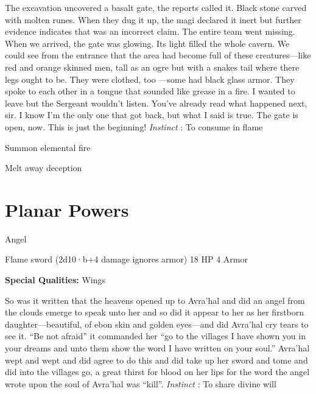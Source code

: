 \startMonsterDescription
The excavation uncovered a basalt gate, the reports called it. Black stone carved with molten runes. When they dug it up, the magi declared it inert but further evidence indicates that was an incorrect claim. The entire team went missing. When we arrived, the gate was glowing. Its light filled the whole cavern. We could see from the entrance that the area had become full of these creatures—like red and orange skinned men, tall as an ogre but with a snakes tail where there legs ought to be. They were clothed, too —some had black glass armor. They spoke to each other in a tongue that sounded like grease in a fire. I wanted to leave but the Sergeant wouldn’t listen. You’ve already read what happened next, sir. I know I’m the only one that got back, but what I said is true. The gate is open, now. This is just the beginning! {\em Instinct} : To consume in flame
\stopMonsterDescription
       
\startitemize[1,packed]
         
\item Summon elemental fire

         
\item Melt away deception

       
\stopitemize
                
\section{Planar Powers}    
            
\startMonsterName
Angel	 
\stopMonsterName
       

Flame sword (2d10·b+4 damage ignores armor)	18 HP	4 Armor

       


       
\startMonsterQualities
         {\bf Special Qualities:}  Wings
\stopMonsterQualities
       
\startMonsterDescription
So was it written that the heavens opened up to Avra’hal and did an angel from the clouds emerge to speak unto her and so did it appear to her as her firstborn daughter—beautiful, of ebon skin and golden eyes—and did Avra’hal cry tears to see it. “Be not afraid” it commanded her “go to the villages I have shown you in your dreams and unto them show the word I have written on your soul.” Avra’hal wept and wept and did agree to do this and did take up her sword and tome and did into the villages go, a great thirst for blood on her lips for the word the angel wrote upon the soul of Avra’hal was “kill”. {\em Instinct} : To share divine will
\stopMonsterDescription
       
